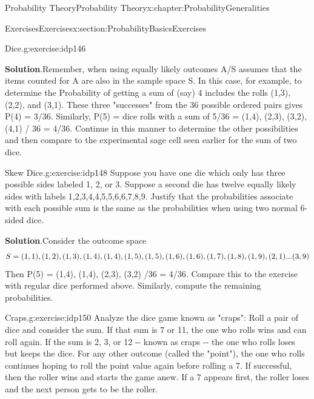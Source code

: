 \documentclass[oneside,10pt,]{book}
\newcommand{\blocktitlefont}{\relax}
\numberwithin{equation}{section}
\begin{document}
\begin{chapterptx}{Probability Theory}{}{Probability Theory}{}{}{x:chapter:ProbabilityGeneralities}
\begin{sectionptx}{Exercises}{}{Exercises}{}{}{x:section:ProbabilityBasicsExercises}
\begin{inlineexercise}{Dice.}{g:exercise:idp146}
\par\smallskip%
\noindent\textbf{\blocktitlefont Solution}.\hypertarget{g:solution:idp147}{}\quad{}Remember, when using equally likely outcomes \textbar{}A\textbar{}\slash{}\textbar{}S\textbar{} assumes that the items counted for A are also in the sample space S.  In this case, for example, to determine the Probability of getting a sum of (say) 4 includes the rolls (1,3), (2,2), and (3,1). These three "successes" from the 36 possible ordered pairs gives P(4) = 3\slash{}36.  Similarly, P(5) = \textbar{}dice rolls with a sum of 5\textbar{}\slash{}36 = \textbar{}(1,4), (2,3), (3,2), (4,1)\textbar{} \slash{} 36 = 4\slash{}36.%
 Continue in this manner to determine the other possibilities and then compare to the experimental sage cell seen earlier for the sum of two dice.%
\end{inlineexercise}%
\begin{inlineexercise}{Skew Dice.}{g:exercise:idp148}%
Suppose you have one die which only has three possible sides labeled 1, 2, or 3. Suppose a second die has twelve equally likely sides with labels 1,2,3,4,4,5,5,6,6,7,8,9.  Justify that the probabilities associate with each possible sum is the same as the probabilities when using two normal 6-sided dice.%
\par\smallskip%
\noindent\textbf{\blocktitlefont Solution}.\hypertarget{g:solution:idp149}{}\quad{}Consider the outcome space%
\begin{equation*}
S = {(1,1), (1,2), (1,3), (1,4), (1,4), (1,5), (1, 5), \\
(1,6), (1,6), (1,7), (1,8), (1,9), (2,1) ... (3,9)}
\end{equation*}
Then P(5) = \textbar{}(1,4), (1,4), (2,3), (3,2) \textbar{}\slash{}36 = 4\slash{}36. Compare this to the exercise with regular dice performed above.  Similarly, compute the remaining probabilities.%
\end{inlineexercise}%
\begin{inlineexercise}{Craps.}{g:exercise:idp150}%
Analyze the dice game known as "craps": Roll a pair of dice and consider the sum. If that sum is 7 or 11, the one who rolls wins and can roll again. If the sum is 2, 3, or 12 -{}-{} known as craps -{}-{} the one who rolls loses but keeps the dice. For any other outcome (called the "point"), the one who rolls continues hoping to roll the point value again before rolling a 7. If successful, then the roller wins and starts the game anew. If a 7 appears first, the roller loses and the next person gets to be the roller.%
\par

\end{inlineexercise}
\end{sectionptx}
\end{chapterptx}
\end{document}
